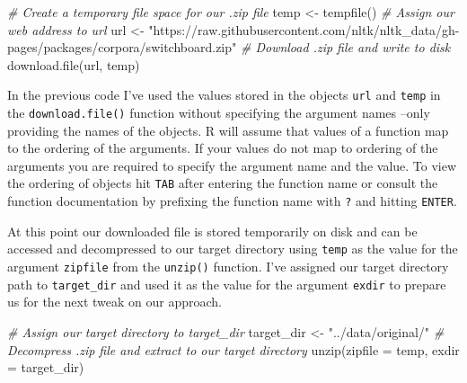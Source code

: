 \documentclass[
  letterpaper,
]{scrbook}
\newenvironment{Shaded}{\begin{snugshade}}{\end{snugshade}}
\newcommand{\AttributeTok}[1]{\textcolor[rgb]{0.00,0.00,0.00}{#1}}
\newcommand{\CommentTok}[1]{\textcolor[rgb]{0.00,0.00,0.00}{\textit{#1}}}
\newcommand{\FunctionTok}[1]{\textcolor[rgb]{0.00,0.00,0.00}{#1}}
\newcommand{\NormalTok}[1]{\textcolor[rgb]{0.00,0.00,0.00}{#1}}
\newcommand{\OtherTok}[1]{\textcolor[rgb]{0.00,0.00,0.00}{#1}}
\newcommand{\StringTok}[1]{\textcolor[rgb]{0.00,0.00,0.00}{#1}}
\begin{document}
\begin{Shaded}
\begin{Highlighting}[]
\CommentTok{\# Create a temporary file space for our .zip file}
\NormalTok{temp }\OtherTok{\textless{}{-}} \FunctionTok{tempfile}\NormalTok{()}
\CommentTok{\# Assign our web address to \textasciigrave{}url\textasciigrave{}}
\NormalTok{url }\OtherTok{\textless{}{-}} \StringTok{"https://raw.githubusercontent.com/nltk/nltk\_data/gh{-}pages/packages/corpora/switchboard.zip"}
\CommentTok{\# Download .zip file and write to disk}
\FunctionTok{download.file}\NormalTok{(url, temp)}
\end{Highlighting}
\end{Shaded}

\begin{tcolorbox}[enhanced jigsaw, title=\textcolor{quarto-callout-warning-color}{\faExclamationTriangle}\hspace{0.5em}{Tip}, titlerule=0mm, toptitle=1mm, colbacktitle=quarto-callout-warning-color!10!white, bottomtitle=1mm, left=2mm, colframe=quarto-callout-warning-color-frame, breakable, toprule=.15mm, colback=white, opacitybacktitle=0.6, leftrule=.75mm, rightrule=.15mm, bottomrule=.15mm, arc=.35mm, coltitle=black, opacityback=0]

In the previous code I've used the values stored in the objects
\texttt{url} and \texttt{temp} in the \texttt{download.file()} function
without specifying the argument names --only providing the names of the
objects. R will assume that values of a function map to the ordering of
the arguments. If your values do not map to ordering of the arguments
you are required to specify the argument name and the value. To view the
ordering of objects hit \texttt{TAB} after entering the function name or
consult the function documentation by prefixing the function name with
\texttt{?} and hitting \texttt{ENTER}.

\end{tcolorbox}

At this point our downloaded file is stored temporarily on disk and can
be accessed and decompressed to our target directory using \texttt{temp}
as the value for the argument \texttt{zipfile} from the \texttt{unzip()}
function. I've assigned our target directory path to
\texttt{target\_dir} and used it as the value for the argument
\texttt{exdir} to prepare us for the next tweak on our approach.

\begin{Shaded}
\begin{Highlighting}[]
\CommentTok{\# Assign our target directory to \textasciigrave{}target\_dir\textasciigrave{}}
\NormalTok{target\_dir }\OtherTok{\textless{}{-}} \StringTok{"../data/original/"}
\CommentTok{\# Decompress .zip file and extract to our target directory}
\FunctionTok{unzip}\NormalTok{(}\AttributeTok{zipfile =}\NormalTok{ temp, }\AttributeTok{exdir =}\NormalTok{ target\_dir)}
\end{Highlighting}
\end{Shaded}
\end{document}
